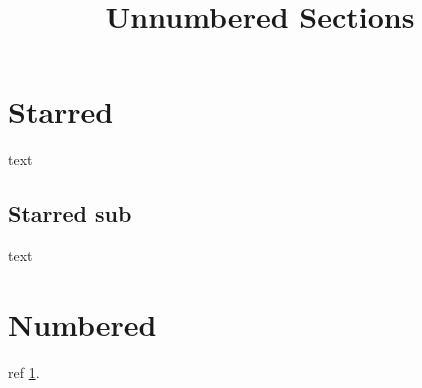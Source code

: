 \documentclass{article}
\begin{document}
\title{Unnumbered Sections}\maketitle
\section*{Starred} text \subsection*{Starred sub} text \section{Numbered}\label{sec:num} ref \ref{sec:num}.
\end{document}
